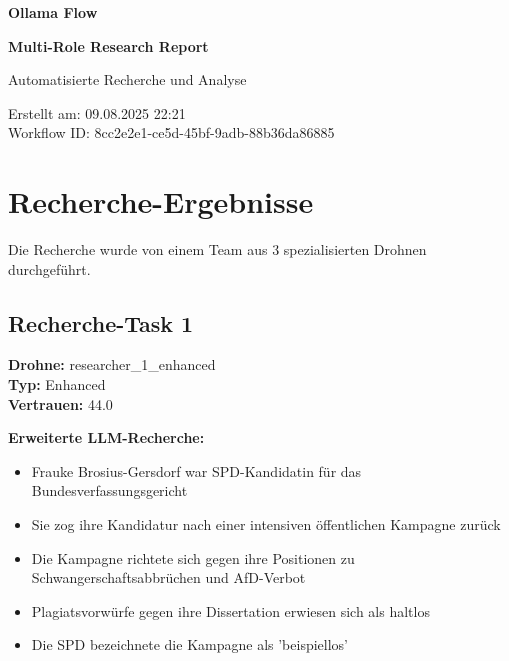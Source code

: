 \documentclass[12pt,a4paper]{article}
\begin{document}
\begin{titlepage}
    \centering
    
    \vspace*{2cm}
    
    {\Huge\bfseries Ollama Flow}
    
    {\Huge\bfseries Multi-Role Research Report}
    
    \vspace{2cm}
    
    {\Large Automatisierte Recherche und Analyse}
    
    \vspace{3cm}
    
    
    \vspace{2cm}
    
    
    \vfill
    
    {\large
    Erstellt am: 09.08.2025 22:21\\
    Workflow ID: 8cc2e2e1-ce5d-45bf-9adb-88b36da86885
    }
    
\end{titlepage}

\newpage
\tableofcontents
\newpage

\section{Recherche-Ergebnisse}

Die Recherche wurde von einem Team aus 3 spezialisierten Drohnen durchgeführt.

\subsection{Recherche-Task 1}

\textbf{Drohne:} researcher\_1\_enhanced\\
\textbf{Typ:} Enhanced\\
\textbf{Vertrauen:} 44.0%

\textbf{Erweiterte LLM-Recherche:}
\begin{itemize}
\item Frauke Brosius-Gersdorf war SPD-Kandidatin für das Bundesverfassungsgericht
\item Sie zog ihre Kandidatur nach einer intensiven öffentlichen Kampagne zurück
\item Die Kampagne richtete sich gegen ihre Positionen zu Schwangerschaftsabbrüchen und AfD-Verbot
\item Plagiatsvorwürfe gegen ihre Dissertation erwiesen sich als haltlos
\item Die SPD bezeichnete die Kampagne als 'beispiellos'
\end{itemize}
\end{document}
